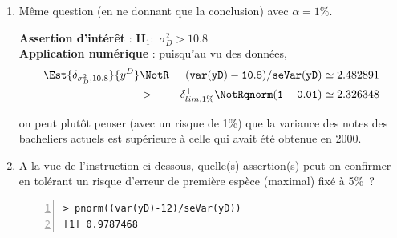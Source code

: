 \documentclass[10pt]{report}
\begin{document}
\begin{exercice}[Dictée]
\begin{enumerate}
\item Même question (en ne donnant que la conclusion) avec $\alpha=1\%$.  


\begin{Correction}

\noindent \textbf{Assertion d'intérêt} :  $\mathbf{H}_1:$ $\sigma^2_{D}>10.8$ \\
\textbf{Application numérique} :  puisqu'au vu des données, 
  \begin{eqnarray*}
\Est{\delta_{\sigma^2_{D},10.8}}{y^{D}} &\NotR&\mathtt{(var(yD)-10.8)/seVar(yD)}\simeq 2.482891\\& >  & \delta^+_{lim,1\%} \NotR \mathtt{qnorm(1-0.01)}\simeq2.326348
\end{eqnarray*}
  
on peut plutôt penser (avec un risque de 1\%) que la variance des notes des bacheliers actuels est supérieure à celle qui avait été obtenue en 2000.
\end{Correction}

\item A la vue de l'instruction ci-dessous, quelle(s) assertion(s) peut-on confirmer en tolérant un risque d'erreur de première espèce (maximal) fixé à 5\%~?

\begin{Verbatim}[frame=leftline,fontfamily=tt,fontshape=n,numbers=left]
> pnorm((var(yD)-12)/seVar(yD))
[1] 0.9787468
\end{Verbatim}



\end{enumerate}

\end{exercice}
\end{document}
